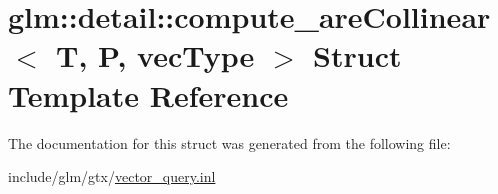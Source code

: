 \hypertarget{structglm_1_1detail_1_1compute__areCollinear}{}\section{glm\+:\+:detail\+:\+:compute\+\_\+are\+Collinear$<$ T, P, vec\+Type $>$ Struct Template Reference}
\label{structglm_1_1detail_1_1compute__areCollinear}


The documentation for this struct was generated from the following file\+:\begin{DoxyCompactItemize}
\item 
include/glm/gtx/\hyperlink{vector__query_8inl}{vector\+\_\+query.\+inl}\end{DoxyCompactItemize}
